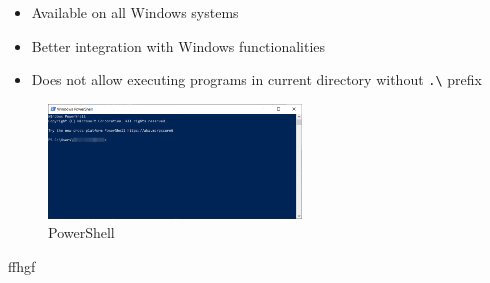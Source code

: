 \documentclass[lang=en,color=green]{elegantbook}
\begin{document}
\noindent\begin{minipage}[t]{0.5\textwidth}%
    \begin{itemize}[leftmargin=*]
        \item Available on all Windows systems
        \item Better integration with Windows functionalities
    \end{itemize}
\end{minipage}%
\begin{minipage}[t]{0.5\textwidth}%
    \begin{itemize}[leftmargin=*]
        \item  Does not allow executing programs in 
        current directory without  \lstinline{.\} prefix
    \end{itemize}
\end{minipage}%

\begin{figure}[htbp]
    \centering
    \includegraphics[width=0.6\textwidth]{images/powershell.png}
    \caption{PowerShell\label{fig:PowerShell}}
\end{figure}
ffhgf
\end{document}
